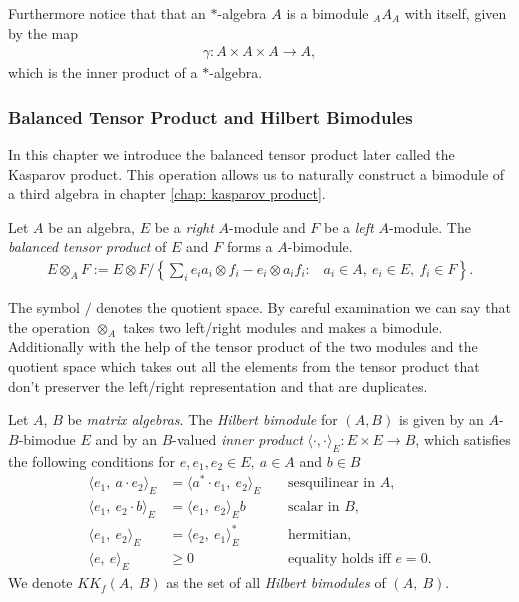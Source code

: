 
Furthermore notice that that an $*$-algebra $A$ is a bimodule ${}_A A_A$ with
itself, given by the map
\begin{align}
    \gamma: A\times A\times A \rightarrow A,
\end{align}
which is the inner product of a $*$-algebra.

\subsubsection{Balanced Tensor Product and Hilbert Bimodules}
In this chapter we introduce the balanced tensor product later called the
Kasparov product. This operation allows us to naturally construct a bimodule
of a third algebra in chapter \ref{chap: kasparov product}.
\begin{mydefinition}
    Let $A$ be an algebra, $E$ be a \textit{right} $A$-module and $F$ be a
    \textit{left} $A$-module.  The \textit{balanced tensor product} of $E$ and
    $F$ forms a $A$-bimodule.
    \begin{align}
        E \otimes _A F := E \otimes F / \left\{\sum _i e_i a_i \otimes f_i -
        e_i \otimes a_i f_i : \;\;\; a_i \in A,\ e_i \in E,\ f_i \in F
    \right\}.
    \end{align}
\end{mydefinition}
The symbol $/$ denotes the quotient space. By careful examination we can say
that the operation $\otimes _A$ takes two left/right modules and makes a
bimodule. Additionally with the help of the tensor product of the two modules and the quotient
space which takes out all the elements from the tensor product that don't
preserver the left/right representation and that are duplicates.
\begin{mydefinition}
    Let $A$, $B$ be \textit{matrix algebras}. The \textit{Hilbert bimodule} for
    $(A, B)$ is given by an $A$-$B$-bimodue $E$ and by an $B$-valued
    \textit{inner product} $\langle \cdot,\cdot\rangle_E: E\times E \rightarrow
    B$, which satisfies the following conditions for $e, e_1, e_2 \in
    E,\ a \in A$ and $b \in B$
\begin{align}
    \langle e_1,\ a\cdot e_2\rangle_E &= \langle a^*\cdot e_1,\ e_2\rangle_E
    \;\;\;\; & \text{sesquilinear in $A$},\\
    \langle e_1,\ e_2 \cdot b\rangle_E
             &= \langle e_1,\ e_2\rangle_E b \;\;\;\; & \text{scalar in $B$},\\
    \langle e_1,\ e_2\rangle_E &= \langle e_2,\ e_1\rangle^*_E \;\;\;\; &
    \text{hermitian}, \\
    \langle e,\ e\rangle_E &\ge 0 \;\;\;\; & \text{equality
    holds iff $e=0$}.
\end{align}
We denote $KK_f(A,\ B)$ as the set of all \textit{Hilbert bimodules} of $(A,\ B)$.
\end{mydefinition}

